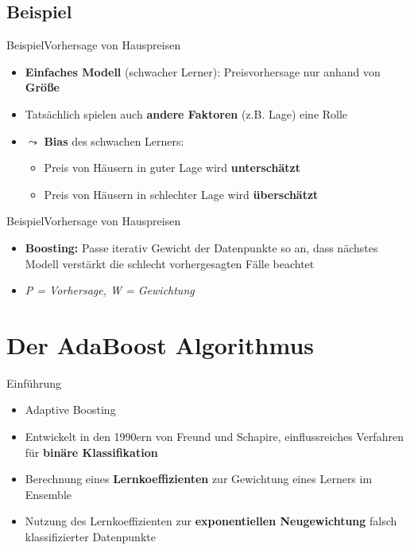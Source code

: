 \documentclass[hyperref={bookmarks=false},11pt,dvipsnames]{beamer}
\begin{document}
\subsection*{Beispiel}
\begin{frame}[t]{Beispiel}{Vorhersage von Hauspreisen}
	\begin{itemize}
		\item <1-> \textbf{Einfaches Modell} (schwacher Lerner): Preisvorhersage nur anhand von \textbf{Größe}
		\item <2-> Tatsächlich spielen auch \textbf{andere Faktoren} (z.B. Lage) eine Rolle
		\item <3-> $\leadsto$ \textbf{Bias} des schwachen Lerners:\\[5pt]
		      \begin{itemize}
			      \item Preis von Häusern in guter Lage wird \textbf{unterschätzt}
			      \item Preis von Häusern in schlechter Lage wird \textbf{überschätzt}
		      \end{itemize}
	\end{itemize}
\end{frame}

\begin{frame}[t]{Beispiel}{Vorhersage von Hauspreisen}
	\begin{itemize}
		\item \textbf{Boosting:} Passe iterativ Gewicht der Datenpunkte so an, dass nächstes Modell verstärkt die schlecht vorhergesagten Fälle beachtet
		\item [] \emph{P = Vorhersage, W = Gewichtung}
	\end{itemize}
	\begin{table}
		\centering
		\resizebox{0.95\textwidth}{!}{%
			
		}
		\resizebox{0.95\textwidth}{!}{%
			
		}
	\end{table}
\end{frame}

\section{Der AdaBoost Algorithmus}
\begin{frame}[t]{Einführung}
	\begin{itemize}
		\item <1-> \glqq Adaptive Boosting\grqq
		\item <2-> Entwickelt in den 1990ern von Freund und Schapire, einflussreiches Verfahren für \textbf{binäre Klassifikation}
		\item <3-> Berechnung eines \textbf{Lernkoeffizienten} zur Gewichtung eines Lerners im Ensemble
		\item <4-> Nutzung des Lernkoeffizienten zur \textbf{exponentiellen Neugewichtung} falsch klassifizierter Datenpunkte
	\end{itemize}
\end{frame}
\end{document}
